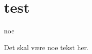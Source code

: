 \documentclass[../MasterThesis.tex]{subfiles}
\begin{document}
\section{test}
noe

Det skal være noe tekst her. 
\end{document}
